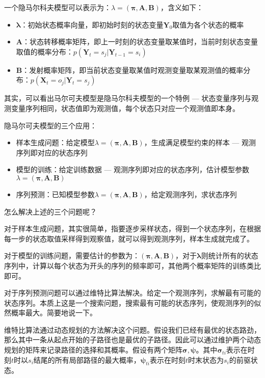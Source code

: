 一个隐马尔科夫模型可以表示为：$\lambda = (\boldsymbol{\pi}, \boldsymbol{A}, \boldsymbol{B})$，含义如下：
\begin{itemize}
	\item $\boldsymbol{\lambda}$：初始状态概率向量，即初始时刻的状态变量$\boldsymbol{Y}_0$取值为各个状态的概率
	\item $\boldsymbol{A}$：状态转移概率矩阵，即上一时刻的状态变量取某值时，当前时刻状态变量取值的概率分布：$p(\boldsymbol{Y}_t=s_j | \boldsymbol{Y}_{t-1}=s_i)$
	\item $\boldsymbol{B}$：发射概率矩阵，即当前状态变量取某值时观测变量取某观测值的概率分布：$p(\boldsymbol{X}_t=o_j | \boldsymbol{Y}_t=s_j)$
\end{itemize}

其实，可以看出马尔可夫模型是隐马尔科夫模型的一个特例 --- 状态变量序列与观测变量序列相同，状态值即为观测值，每个状态只对应一个观测值即本身。

隐马尔可夫模型的三个应用：
\begin{itemize}
	\item 样本生成问题：给定模型$\lambda = (\boldsymbol{\pi}, \boldsymbol{A}, \boldsymbol{B})$，生成满足模型约束的样本 --- 观测序列即对应的状态序列
	\item 模型的训练：给定训练数据 --- 观测序列即对应的状态序列，估计模型参数$\lambda = (\boldsymbol{\pi}, \boldsymbol{A}, \boldsymbol{B})$
	\item 序列预测：已知模型参数$\lambda = (\boldsymbol{\pi}, \boldsymbol{A}, \boldsymbol{B})$，给定观测序列，求状态序列
\end{itemize}

怎么解决上述的三个问题呢？

对于样本生成问题，其实很简单，指要逐步采样状态，得到一个状态序列，在根据每一步的状态取值采样得到观察值，就可以得到观测序列，样本生成就完成了。

对于模型的训练问题，需要估计的参数为：$(\boldsymbol{\pi}, \boldsymbol{A}, \boldsymbol{B})$，对于$\boldsymbol{\lambda}$则统计所有的状态序列中，计算以每个状态为开头的序列的频率即可，其他两个概率矩阵的训练类比即可。

对于序列预测问题可以通过维特比算法解决。给定一个观测序列，求解最有可能的状态序列。本质上这是一个搜索问题，搜索最有可能的状态序列，使观测序列的似然概率最大。简要地说一下。

维特比算法通过动态规划的方法解决这个问题。假设我们已经有最优的状态路劲，那么其中一条从起点开始的子路径也是最优的子路径。因此可以通过维护两个动态规划的矩阵来记录路径的选择和其概率。假设有两个矩阵$\boldsymbol{\sigma}, \boldsymbol{\psi}$。其中$\boldsymbol{\sigma}_{ti}$表示在时刻$t$时以$s_i$结尾的所有局部路径的最大概率，$\boldsymbol{\psi}_{ti}$表示在时刻$t$时末状态为$s_i$的前驱状态。

